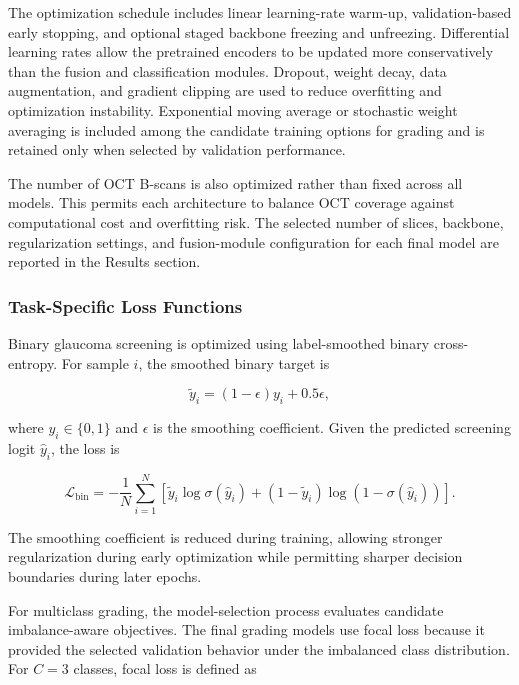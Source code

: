 \documentclass[preprint,12pt]{elsarticle}
\begin{document}
The optimization schedule includes linear learning-rate warm-up, validation-based early stopping, and optional staged backbone freezing and unfreezing. Differential learning rates allow the pretrained encoders to be updated more conservatively than the fusion and classification modules. Dropout, weight decay, data augmentation, and gradient clipping are used to reduce overfitting and optimization instability. Exponential moving average or stochastic weight averaging is included among the candidate training options for grading and is retained only when selected by validation performance.

The number of OCT B-scans is also optimized rather than fixed across all models. This permits each architecture to balance OCT coverage against computational cost and overfitting risk. The selected number of slices, backbone, regularization settings, and fusion-module configuration for each final model are reported in the Results section.

\subsubsection{Task-Specific Loss Functions}
\label{subsubsec:loss_functions}

Binary glaucoma screening is optimized using label-smoothed binary cross-entropy. For sample $i$, the smoothed binary target is

\begin{equation}
    \tilde{y}_{i}
    =
    (1-\epsilon)y_{i}
    +
    0.5\epsilon,
    \label{eq:binary_smoothing}
\end{equation}

where $y_i\in\{0,1\}$ and $\epsilon$ is the smoothing coefficient. Given the predicted screening logit $\hat{y}_{i}$, the loss is

\begin{equation}
    \mathcal{L}_{\mathrm{bin}}
    =
    -\frac{1}{N}
    \sum_{i=1}^{N}
    \left[
        \tilde{y}_{i}\log\sigma(\hat{y}_{i})
        +
        \left(1-\tilde{y}_{i}\right)
        \log\left(1-\sigma(\hat{y}_{i})\right)
        \right].
    \label{eq:binary_loss}
\end{equation}

The smoothing coefficient is reduced during training, allowing stronger regularization during early optimization while permitting sharper decision boundaries during later epochs.

For multiclass grading, the model-selection process evaluates candidate imbalance-aware objectives. The final grading models use focal loss because it provided the selected validation behavior under the imbalanced class distribution. For $C=3$ classes, focal loss is defined as
\end{document}
